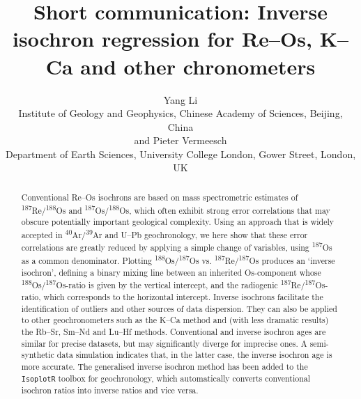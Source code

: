 \documentclass[]{article}
\begin{document}
\title{Short communication: Inverse isochron regression for Re--Os,
  K--Ca and other chronometers}


\author[1]{Yang Li\\
  Institute of Geology and Geophysics, Chinese Academy of Sciences, Beijing, China\\
  and Pieter Vermeesch\\
  Department of Earth Sciences, University College London, Gower Street, London, UK
}

\maketitle

\begin{abstract}
Conventional Re--Os isochrons are based on mass spectrometric
estimates of \textsuperscript{187}Re/\textsuperscript{188}Os and
\textsuperscript{187}Os/\textsuperscript{188}Os, which often exhibit
strong error correlations that may obscure potentially important
geological complexity. Using an approach that is widely accepted in
\textsuperscript{40}Ar/\textsuperscript{39}Ar and U--Pb geochronology,
we here show that these error correlations are greatly reduced by
applying a simple change of variables, using \textsuperscript{187}Os
as a common denominator. Plotting
\textsuperscript{188}Os/\textsuperscript{187}Os
vs. \textsuperscript{187}Re/\textsuperscript{187}Os produces an
`inverse isochron', defining a binary mixing line between an inherited
Os-component whose
\textsuperscript{188}Os/\textsuperscript{187}Os-ratio is given by the
vertical intercept, and the radiogenic
\textsuperscript{187}Re/\textsuperscript{187}Os-ratio, which
corresponds to the horizontal intercept. Inverse isochrons facilitate
the identification of outliers and other sources of data dispersion.
They can also be applied to other geochronometers such as the K--Ca
method and (with less dramatic results) the Rb--Sr, Sm--Nd and Lu--Hf
methods. Conventional and inverse isochron ages are similar for
precise datasets, but may significantly diverge for imprecise ones. A
semi-synthetic data simulation indicates that, in the latter case, the
inverse isochron age is more accurate. The generalised inverse
isochron method has been added to the \texttt{IsoplotR} toolbox for
geochronology, which automatically converts conventional isochron
ratios into inverse ratios and vice versa.
\end{abstract}
\end{document}
